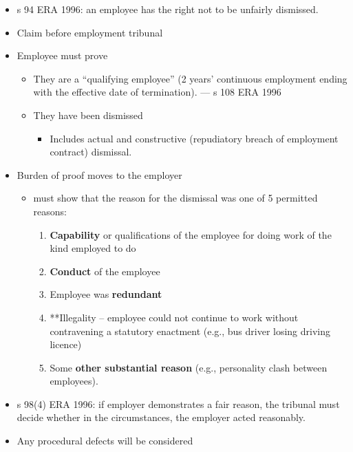 \documentclass[
]{article}
\providecommand{\tightlist}{%
  \setlength{\itemsep}{0pt}\setlength{\parskip}{0pt}}
\begin{document}
\begin{itemize}
\tightlist
\item
  s 94 ERA 1996: an employee has the right not to be unfairly dismissed.
\item
  Claim before employment tribunal
\item
  Employee must prove

  \begin{itemize}
  \tightlist
  \item
    They are a ``qualifying employee'' (2 years' continuous employment
    ending with the effective date of termination). --- s 108 ERA 1996
  \item
    They have been dismissed

    \begin{itemize}
    \tightlist
    \item
      Includes actual and constructive (repudiatory breach of employment
      contract) dismissal.
    \end{itemize}
  \end{itemize}
\item
  Burden of proof moves to the employer

  \begin{itemize}
  \tightlist
  \item
    must show that the reason for the dismissal was one of 5 permitted
    reasons:

    \begin{enumerate}
    \def\labelenumi{\arabic{enumi}.}
    \tightlist
    \item
      \textbf{Capability} or qualifications of the employee for doing
      work of the kind employed to do
    \item
      \textbf{Conduct} of the employee
    \item
      Employee was \textbf{redundant}
    \item
      **Illegality -- employee could not continue to work without
      contravening a statutory enactment (e.g., bus driver losing
      driving licence)
    \item
      Some \textbf{other substantial reason} (e.g., personality clash
      between employees).
    \end{enumerate}
  \end{itemize}
\item
  s 98(4) ERA 1996: if employer demonstrates a fair reason, the tribunal
  must decide whether in the circumstances, the employer acted
  reasonably.
\item
  Any procedural defects will be considered


\end{itemize}
\end{document}
